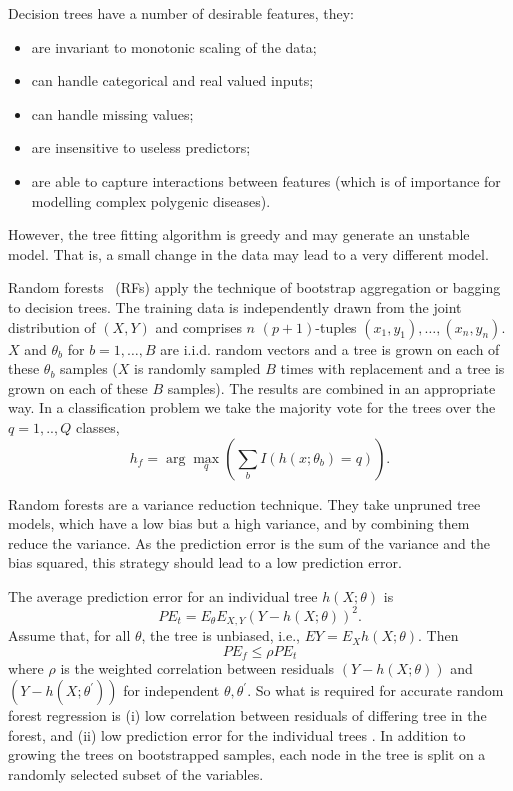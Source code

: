 \documentclass[10pt,letterpaper]{article}
\begin{document}
Decision trees have a number of desirable features, they:
\begin{itemize}
  \item are invariant to monotonic scaling of the data;
  \item can handle categorical and real valued inputs;
  \item can handle missing values;
  \item are insensitive to useless predictors;
  \item are able to capture interactions between features (which is of importance for modelling complex polygenic diseases).
  \end{itemize}
However, the tree fitting algorithm is greedy and may generate an unstable model. That is, a small change in the data may
lead to a very different model. 

Random forests~\cite{Breiman2001} (RFs) apply the technique of bootstrap aggregation or bagging to decision trees.  The training
data is independently drawn from the joint distribution of $(X,Y)$ and comprises $n$ $(p+1)$-tuples $(x_1,y_1),\ldots, (x_n,y_n)$.
$X$ and $\theta_b$ for $b=1,\ldots,B$ are i.i.d. random vectors and a tree is grown on each of these $\theta_b$ samples 
($X$ is randomly sampled $B$ times with replacement and a tree is grown on each of these $B$ samples). 
The results are combined in an appropriate way. In a classification problem we take the majority vote for the trees over
the $q=1,..,Q$ classes,
\begin{equation*}
{{h_f}}= \arg \max_q \left(\sum_b I(h(x;\theta_b)=q)\right).
\end{equation*}

Random forests are a variance reduction technique. They take unpruned tree models, which have a low bias but a high
variance, and by combining them reduce the variance. As the prediction error is the sum of the variance and the bias
squared, this strategy should lead to a low prediction error.

The average prediction error for an individual tree $h(X; \theta)$ is
\begin{equation}
PE_t = E_\theta E_{X,Y} (Y-h(X; \theta))^2.
\end{equation}
Assume that, for all $\theta$, the tree is unbiased, i.e., $EY= E_X h(X; \theta)$. Then
\begin{equation}
PE_f \leq \rho PE_t
\end{equation}
where $\rho$ is the weighted correlation between residuals $(Y-h(X;\theta))$ and $(Y-h(X;\theta^\prime))$ for independent $\theta,
\theta^\prime$.  
So what is required for accurate random forest regression is (i) low correlation between residuals of differing tree in
the forest, and (ii) low prediction error for the individual trees \cite{Segal.2004}. In addition to growing the trees
on bootstrapped samples, each node in the tree is split on a randomly selected subset of the variables.
\end{document}
